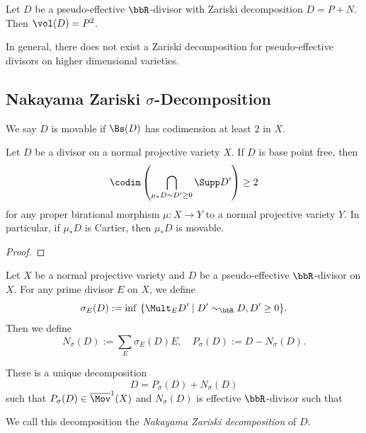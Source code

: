   \begin{corollary}
    Let $D$ be a pseudo-effective $\bbR$-divisor with Zariski decomposition $D = P + N$.
    Then $\vol(D) = P^2$.
   \Yang{}
  \end{corollary}


  \begin{remark}
    In general, there does not exist a Zariski decomposition for pseudo-effective divisors on higher dimensional varieties.
   \Yang{}
  \end{remark}

  \begin{example}
    \Yang{}
  \end{example}


\subsection[Nakayama Zariski Decomposition]{Nakayama Zariski $\sigma$-Decomposition}

  \begin{definition}
     We say $D$ is movable if $\Bs(D)$ has codimension at least $2$ in $X$.
     \Yang{}
  \end{definition}
  
  \begin{proposition}
    Let $D$ be a divisor on a normal  projective variety $X$.
    If $D$ is base point free, then 
    \[ \codim \left(\bigcap_{\mu_*D \sim D' \geq 0} \Supp D'\right) \geq 2 \]
    for any proper birational morphism $\mu: X \to Y$ to a normal projective variety $Y$.
    In particular, if $\mu_*D$ is Cartier, then $\mu_*D$ is movable.
    \Yang{}
  \end{proposition}
  \begin{proof}
    \Yang{}
  \end{proof}

  Let $X$ be a normal projective variety and $D$ be a pseudo-effective $\bbR$-divisor on $X$. For any prime divisor $E$ on $X$, we define
  \[ \sigma_E(D) := \inf\ \{ \Mult_E D' \mid D' \sim_\bbR D, D' \geq 0 \}. \]
  Then we define
  \[ N_\sigma(D) := \sum_E \sigma_E(D) E, \quad P_\sigma(D) := D - N_\sigma(D). \]


  \begin{theorem}
    There is a unique decomposition
    \[ D = P_\sigma(D) + N_\sigma(D) \]
    such that $P_\sigma(D) \in \overline{\Mov}^1(X)$ and $N_\sigma(D)$ is effective $\bbR$-divisor such that \Yang{}
    
    We call this decomposition the \emph{Nakayama Zariski decomposition} of $D$.

    \Yang{}
  \end{theorem}



